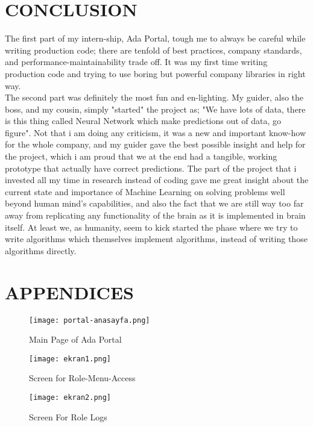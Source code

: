 \documentclass[titlepage, a4paper, 14pt]{extarticle} %
\begin{document}
\section{CONCLUSION} \label{conclusion}

The first part of my intern-ship, Ada Portal, tough me to always be careful while writing production code; there are tenfold of best practices, company standards, and performance-maintainability trade off. It was my first time writing production code and trying to use boring but powerful company libraries in right way.\\

The second part was definitely the most fun and en-lighting. My guider, also the boss, and my cousin, simply "started" the project as; "We have lots of data, there is this thing called Neural Network which make predictions out of data, go figure". Not that i am doing any criticism, it was a new and important know-how for the whole company, and my guider gave the best possible insight and help for the project, which i am proud that we at the end had a tangible, working prototype that actually have correct predictions. The part of the project that i invested all my time in research instead of coding gave me great insight about the current state and importance of Machine Learning on solving problems well beyond human mind's capabilities, and also the fact that we are still way too far away from replicating any functionality of the brain as it is implemented in brain itself. At least we, as humanity, seem to kick started the phase where we try to write algorithms which themselves implement algorithms, instead of writing those algorithms directly. \\


\section{APPENDICES} \label{apendis}

\begin{figure}[H]
\centering
\texttt{[image: portal-anasayfa.png]}
\caption{Main Page of Ada Portal}
\end{figure}

\begin{figure}[H]
\centering
\texttt{[image: ekran1.png]}
\caption{Screen for Role-Menu-Access}
\end{figure}

\begin{figure}[H]
\centering
\texttt{[image: ekran2.png]}
\caption{Screen For Role Logs}
\end{figure}
\end{document}

